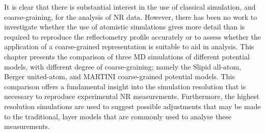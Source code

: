 It is clear that there is substantial interest in the use of classical simulation, and coarse-graining, for the analysis of NR data.
However, there has been no work to investigate whether the use of atomistic simulations gives more detail than is required to reproduce the reflectometry profile accurately or to assess whether the application of a coarse-grained representation is suitable to aid in analysis.
This chapter presents the comparison of three MD simulations of different potential models, with different degree of coarse-graining; namely the Slipid all-atom, Berger united-atom, and MARTINI coarse-grained potential models.
This comparison offers a fundamental insight into the simulation resolution that is necessary to reproduce experimental NR measurements.
Furthermore, the highest resolution simulations are used to suggest possible adjustments that may be made to the traditional, layer models that are commonly used to analyse these measurements.

